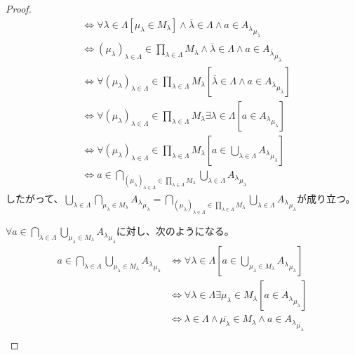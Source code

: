 \documentclass[a4paper]{jsarticle}
\begin{document}
\begin{proof}
\begin{align*}
&\Leftrightarrow \forall\lambda \in \varLambda\left[ \mu_{\lambda} \in M_{\lambda} \right] \land \overline{\lambda} \in \varLambda \land a \in {A_{\overline{\lambda}}}_{\mu_{\overline{\lambda}}}\\
&\Leftrightarrow \left( \mu_{\lambda} \right)_{\lambda \in \varLambda} \in \prod_{\lambda \in \varLambda} M_{\lambda} \land \overline{\lambda} \in \varLambda \land a \in {A_{\overline{\lambda}}}_{\mu_{\overline{\lambda}}}\\
&\Leftrightarrow \forall\left( \mu_{\lambda} \right)_{\lambda \in \varLambda} \in \prod_{\lambda \in \varLambda} M_{\lambda}\left[ \overline{\lambda} \in \varLambda \land a \in {A_{\overline{\lambda}}}_{\mu_{\overline{\lambda}}} \right]\\
&\Leftrightarrow \forall\left( \mu_{\lambda} \right)_{\lambda \in \varLambda} \in \prod_{\lambda \in \varLambda} M_{\lambda}\exists\lambda \in \varLambda\left[ a \in {A_{\lambda}}_{\mu_{\lambda}} \right]\\
&\Leftrightarrow \forall\left( \mu_{\lambda} \right)_{\lambda \in \varLambda} \in \prod_{\lambda \in \varLambda} M_{\lambda}\left[ a \in \bigcup_{\lambda \in \varLambda} {A_{\lambda}}_{\mu_{\lambda}} \right]\\
&\Leftrightarrow a \in \bigcap_{\left( \mu_{\lambda} \right)_{\lambda \in \varLambda} \in \prod_{\lambda \in \varLambda} M_{\lambda}} {\bigcup_{\lambda \in \varLambda} {A_{\lambda}}_{\mu_{\lambda}}}
\end{align*}
したがって、$\bigcup_{\lambda \in \varLambda} {\bigcap_{\mu_{\lambda} \in M_{\lambda}} {A_{\lambda}}_{\mu_{\lambda}}} = \bigcap_{\left( \mu_{\lambda} \right)_{\lambda \in \varLambda} \in \prod_{\lambda \in \varLambda} M_{\lambda}} {\bigcup_{\lambda \in \varLambda} {A_{\lambda}}_{\mu_{\lambda}}}$が成り立つ。\par
$\forall a \in \bigcap_{\lambda \in \varLambda} {\bigcup_{\mu_{\lambda} \in M_{\lambda}} {A_{\lambda}}_{\mu_{\lambda}}}$に対し、次のようになる。
\begin{align*}
a \in \bigcap_{\lambda \in \varLambda} {\bigcup_{\mu_{\lambda} \in M_{\lambda}} {A_{\lambda}}_{\mu_{\lambda}}} &\Leftrightarrow \forall\lambda \in \varLambda\left[ a \in \bigcup_{\mu_{\lambda} \in M_{\lambda}} {A_{\lambda}}_{\mu_{\lambda}} \right]\\
&\Leftrightarrow \forall\lambda \in \varLambda\exists\mu_{\lambda} \in M_{\lambda}\left[ a \in {A_{\lambda}}_{\mu_{\lambda}} \right]\\
&\Leftrightarrow \lambda \in \varLambda \land \overline{\mu_{\lambda}} \in M_{\lambda} \land a \in {A_{\lambda}}_{\overline{\mu_{\lambda}}}\\

\end{align*}
\end{proof}
\end{document}

